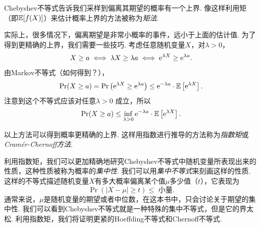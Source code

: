 Chebyshev不等式告诉我们采样到偏离其期望的概率有一个上界. 像这样利用矩（即$\mathbb{E}[f(X)]$）来估计概率上界的方法被称为\textit{矩法}. 

实际上，很多情况下，偏离期望是非常小概率的事件，远小于上面的估计值. 为了得到更精确的上界，我们需要一些技巧. 考虑任意随机变量$X$，对$\lambda >0$，
\[
X\geq a \iff \lambda X \geq \lambda a \iff \mathrm{e}^{\lambda X} \geq \mathrm{e}^{\lambda a}.
\]
由Markov不等式（如何得到？），
\[
\Pr(X\geq a) = \Pr\left(\mathrm{e}^{\lambda X} \geq \mathrm{e}^{\lambda a}\right) \leq \mathrm{e}^{- \lambda a}\cdot \mathbb{E}\left[\mathrm{e}^{\lambda X}\right]. 
\]
注意到这个不等式应该对任意$\lambda > 0$ 成立，所以
\[
\Pr(X\geq a) \leq \inf_{\lambda >0} \mathrm{e}^{- \lambda a}\cdot \mathbb{E} \left[\mathrm{e}^{\lambda X}\right].
\]

以上方法可以得到概率更精确的上界. 这样用指数进行推导的方法称为\textit{指数矩}或\textit{Cramér-Chernoff方法}. 

利用指数矩，我们可以更加精确地研究Chebyshev不等式中随机变量所表现出来的性质，这种性质被称为概率的\textit{集中性}. 我们可以用\textit{集中不等式}来刻画这样的性质. 这样的不等式描述随机变量$X$有多大概率偏离某个值$\mu$多少值（$t$），它表现为
\[
\Pr(| X - \mu| \geq t) \leq \text{ 小量}.
\]
通常来说，$\mu$是随机变量的期望或者中位数，在这本书中，只会讨论关于期望的集中性. 我们可以看到Chebyshev不等式就是一种特殊的集中不等式，但是它的界太松. 利用指数矩，我们将证明更紧的Hoeffding不等式和Chernoff不等式. 

